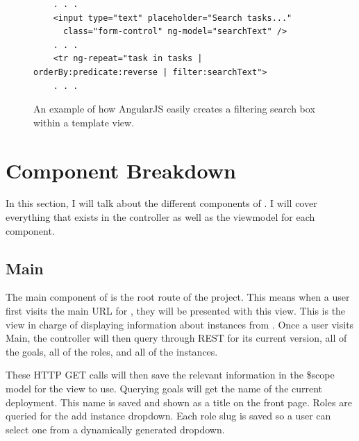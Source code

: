 \begin{figure}[H]
  \begin{center}
    \renewcommand{\theFancyVerbLine}{
      \sffamily\textcolor[rgb]{0.5,0.5,0.5}{\scriptsize\arabic{FancyVerbLine}}}
    \begin{verbatim}
    . . .
    <input type="text" placeholder="Search tasks..." 
      class="form-control" ng-model="searchText" />
    . . .
    <tr ng-repeat="task in tasks | orderBy:predicate:reverse | filter:searchText">
    . . .
    \end{verbatim}

  \end{center}
  \caption{An example of how AngularJS easily creates a filtering search box within a template view.}
  \label{filterTextSearch}
\end{figure}

\section{Component Breakdown}
\label{makereference3.4}

In this section, I will talk about the different components of \projectName. I will cover everything that exists in the controller as well as the viewmodel for each component.

\subsection{Main}

The main component of \projectName{} is the root route of the project. This means when a user first visits the main URL for \projectName{}, they will be presented with this view. This is the view in charge of displaying information about instances from \ancor{}. Once a user visits Main, the controller will then query \ancor{} through REST for its current version, all of the goals, all of the roles, and all of the instances.

These HTTP GET calls will then save the relevant information in the \$scope model for the view to use. Querying goals will get the name of the current deployment. This name is saved and shown as a title on the front page. Roles are queried for the add instance dropdown. Each role slug is saved so a user can select one from a dynamically generated dropdown.


